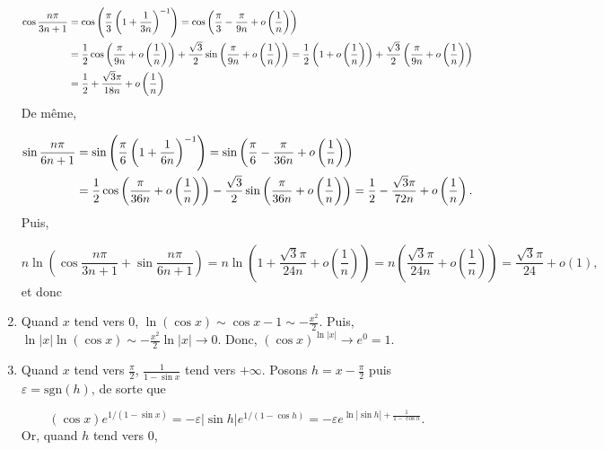 \documentclass[11pt,a4paper]{article}
\begin{document}
\begin{enumerate}
\begin{align*}\ensuremath
\cos\frac{n\pi}{3n+1}&=\cos\left(\frac{\pi}{3}\left(1+\frac{1}{3n}\right)^{-1}\right)
=\cos\left(\frac{\pi}{3}-\frac{\pi}{9n}+o\left(\frac{1}{n}\right)\right)\\
 &=\frac{1}{2}\cos\left(\frac{\pi}{9n}+o\left(\frac{1}{n}\right)\right)+\frac{\sqrt{3}}{2}\sin\left(\frac{\pi}{9n}+o\left(\frac{1}{n}\right)\right)=\frac{1}{2}\left(1+o\left(\frac{1}{n}\right)\right)+\frac{\sqrt{3}}{2}\left(\frac{\pi}{9n}+o\left(\frac{1}{n}\right)\right)\\
  &=\frac{1}{2}+\frac{\sqrt{3}\pi}{18n}+o\left(\frac{1}{n}\right)
\end{align*}
De même, 

\begin{align*}\ensuremath
\sin\frac{n\pi}{6n+1}&=\sin\left(\frac{\pi}{6}\left(1+\frac{1}{6n}\right)^{-1}\right)=\sin\left(\frac{\pi}{6}-\frac{\pi}{36n}
+o\left(\frac{1}{n}\right)\right)\\
 &=\frac{1}{2}\cos\left(\frac{\pi}{36n}+o\left(\frac{1}{n}\right)\right)-\frac{\sqrt{3}}{2}
 \sin\left(\frac{\pi}{36n}+o\left(\frac{1}{n}\right)\right)
 =\frac{1}{2}-\frac{\sqrt{3}\pi}{72n}+o\left(\frac{1}{n}\right).
\end{align*}
Puis, 

$$n\ln\left(\cos\frac{n\pi}{3n+1}+\sin\frac{n\pi}{6n+1}\right)=n\ln\left(1+\frac{\sqrt{3}\pi}{24n}+ o\left(\frac{1}{n}\right)\right)= n\left(\frac{\sqrt{3}\pi}{24n}+o\left(\frac{1}{n}\right)\right)=\frac{\sqrt{3}\pi}{24}+o(1),$$
et donc

\begin{center}
\end{center}
 \item  Quand $x$ tend vers $0$, $\ln(\cos x)\sim\cos x-1\sim-\frac{x^2}{2}$. Puis, $\ln|x|\ln(\cos x)\sim-\frac{x^2}{2}\ln|x|\rightarrow0$.
Donc, $(\cos x)^{\ln|x|}\rightarrow e^0=1$.

\begin{center}
\end{center}
 \item  Quand $x$ tend vers $\frac{\pi}{2}$, $\frac{1}{1-\sin x}$ tend vers $+\infty$. Posons $h=x-\frac{\pi}{2}$ puis $\varepsilon=\mbox{sgn}(h)$, de sorte que 

$$(\cos x)e^{1/(1-\sin x)}=-\varepsilon|\sin h|e^{1/(1-\cos h)}=-\varepsilon e^{\ln|\sin h|+\frac{1}{1-\cos h}}.$$
Or, quand $h$ tend vers $0$, 


\end{enumerate}
\end{document}
